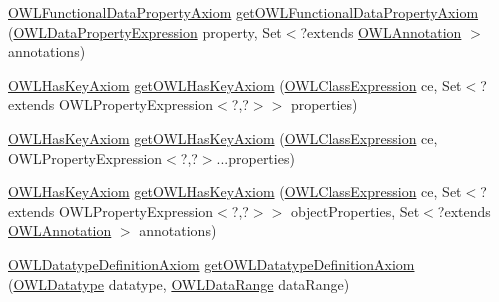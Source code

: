 \begin{DoxyCompactItemize}
\hyperlink{interfaceorg_1_1semanticweb_1_1owlapi_1_1model_1_1_o_w_l_functional_data_property_axiom}{O\-W\-L\-Functional\-Data\-Property\-Axiom} \hyperlink{interfaceorg_1_1semanticweb_1_1owlapi_1_1model_1_1_o_w_l_data_factory_a4105f9a3b88bc73926e80b979c5befc8}{get\-O\-W\-L\-Functional\-Data\-Property\-Axiom} (\hyperlink{interfaceorg_1_1semanticweb_1_1owlapi_1_1model_1_1_o_w_l_data_property_expression}{O\-W\-L\-Data\-Property\-Expression} property, Set$<$?extends \hyperlink{interfaceorg_1_1semanticweb_1_1owlapi_1_1model_1_1_o_w_l_annotation}{O\-W\-L\-Annotation} $>$ annotations)
\item 
\hyperlink{interfaceorg_1_1semanticweb_1_1owlapi_1_1model_1_1_o_w_l_has_key_axiom}{O\-W\-L\-Has\-Key\-Axiom} \hyperlink{interfaceorg_1_1semanticweb_1_1owlapi_1_1model_1_1_o_w_l_data_factory_ae5970d3195ce9da0e1678048c7af4b57}{get\-O\-W\-L\-Has\-Key\-Axiom} (\hyperlink{interfaceorg_1_1semanticweb_1_1owlapi_1_1model_1_1_o_w_l_class_expression}{O\-W\-L\-Class\-Expression} ce, Set$<$?extends O\-W\-L\-Property\-Expression$<$?,?$>$$>$ properties)
\item 
\hyperlink{interfaceorg_1_1semanticweb_1_1owlapi_1_1model_1_1_o_w_l_has_key_axiom}{O\-W\-L\-Has\-Key\-Axiom} \hyperlink{interfaceorg_1_1semanticweb_1_1owlapi_1_1model_1_1_o_w_l_data_factory_a70d6d88b95e4e5f6832d9d72f1cdfe45}{get\-O\-W\-L\-Has\-Key\-Axiom} (\hyperlink{interfaceorg_1_1semanticweb_1_1owlapi_1_1model_1_1_o_w_l_class_expression}{O\-W\-L\-Class\-Expression} ce, O\-W\-L\-Property\-Expression$<$?,?$>$...properties)
\item 
\hyperlink{interfaceorg_1_1semanticweb_1_1owlapi_1_1model_1_1_o_w_l_has_key_axiom}{O\-W\-L\-Has\-Key\-Axiom} \hyperlink{interfaceorg_1_1semanticweb_1_1owlapi_1_1model_1_1_o_w_l_data_factory_a7b51c543f6f20d77cde07a82701789b5}{get\-O\-W\-L\-Has\-Key\-Axiom} (\hyperlink{interfaceorg_1_1semanticweb_1_1owlapi_1_1model_1_1_o_w_l_class_expression}{O\-W\-L\-Class\-Expression} ce, Set$<$?extends O\-W\-L\-Property\-Expression$<$?,?$>$$>$ object\-Properties, Set$<$?extends \hyperlink{interfaceorg_1_1semanticweb_1_1owlapi_1_1model_1_1_o_w_l_annotation}{O\-W\-L\-Annotation} $>$ annotations)
\item 
\hyperlink{interfaceorg_1_1semanticweb_1_1owlapi_1_1model_1_1_o_w_l_datatype_definition_axiom}{O\-W\-L\-Datatype\-Definition\-Axiom} \hyperlink{interfaceorg_1_1semanticweb_1_1owlapi_1_1model_1_1_o_w_l_data_factory_ab51e17f6558b23bbb6ff4ea3473294f6}{get\-O\-W\-L\-Datatype\-Definition\-Axiom} (\hyperlink{interfaceorg_1_1semanticweb_1_1owlapi_1_1model_1_1_o_w_l_datatype}{O\-W\-L\-Datatype} datatype, \hyperlink{interfaceorg_1_1semanticweb_1_1owlapi_1_1model_1_1_o_w_l_data_range}{O\-W\-L\-Data\-Range} data\-Range)

\end{DoxyCompactItemize}
